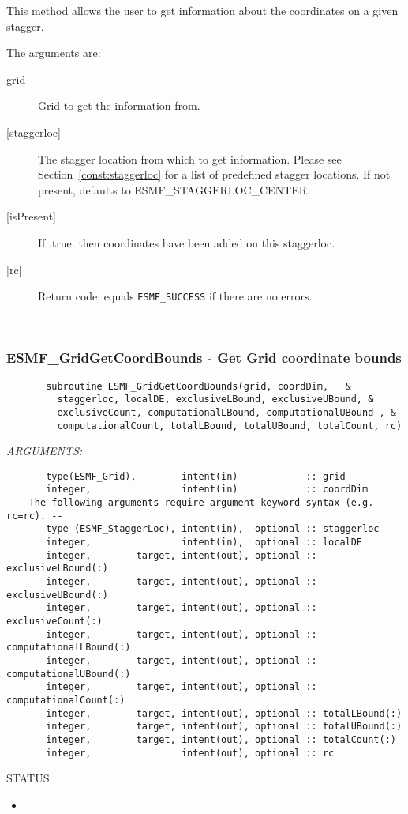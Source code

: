       This method allows the user to get information about the coordinates on a given
      stagger.
  
       The arguments are:
       \begin{description}
       \item[grid]
            Grid to get the information from.
       \item[{[staggerloc]}]
            The stagger location from which to get information.
            Please see Section~\ref{const:staggerloc} for a list
            of predefined stagger locations. If not present, defaults to ESMF\_STAGGERLOC\_CENTER.
       \item[{[isPresent]}]
            If .true. then coordinates have been added on this staggerloc.
       \item[{[rc]}]
            Return code; equals {\tt ESMF\_SUCCESS} if there are no errors.
     \end{description}
   
 
\mbox{}\hrulefill\ 
 
\subsubsection [ESMF\_GridGetCoordBounds] {ESMF\_GridGetCoordBounds - Get Grid coordinate bounds}


 
\begin{verbatim}       subroutine ESMF_GridGetCoordBounds(grid, coordDim,   &
         staggerloc, localDE, exclusiveLBound, exclusiveUBound, &
         exclusiveCount, computationalLBound, computationalUBound , &
         computationalCount, totalLBound, totalUBound, totalCount, rc)
 \end{verbatim}{\em ARGUMENTS:}
\begin{verbatim}       type(ESMF_Grid),        intent(in)            :: grid
       integer,                intent(in)            :: coordDim
 -- The following arguments require argument keyword syntax (e.g. rc=rc). --
       type (ESMF_StaggerLoc), intent(in),  optional :: staggerloc
       integer,                intent(in),  optional :: localDE
       integer,        target, intent(out), optional :: exclusiveLBound(:)
       integer,        target, intent(out), optional :: exclusiveUBound(:)
       integer,        target, intent(out), optional :: exclusiveCount(:)
       integer,        target, intent(out), optional :: computationalLBound(:)
       integer,        target, intent(out), optional :: computationalUBound(:)
       integer,        target, intent(out), optional :: computationalCount(:)
       integer,        target, intent(out), optional :: totalLBound(:)
       integer,        target, intent(out), optional :: totalUBound(:)
       integer,        target, intent(out), optional :: totalCount(:)
       integer,                intent(out), optional :: rc\end{verbatim}
{\sf STATUS:}
   \begin{itemize}
   \item{}
   \end{itemize}
  
